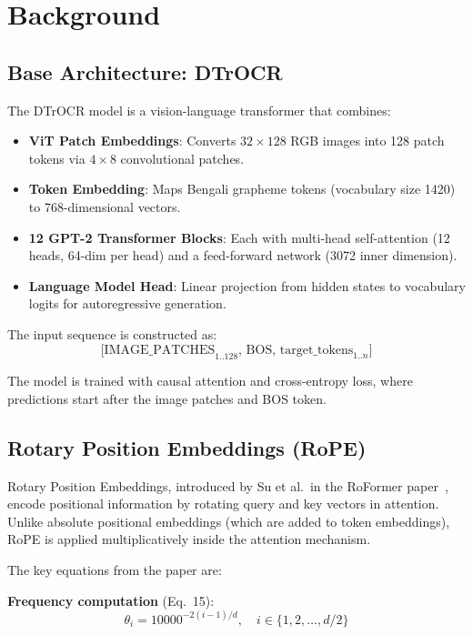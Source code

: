 \documentclass[11pt, a4paper]{article}
\begin{document}
\section{Background}

\subsection{Base Architecture: DTrOCR}

The DTrOCR model is a vision-language transformer that combines:
\begin{itemize}
    \item \textbf{ViT Patch Embeddings}: Converts $32 \times 128$ RGB images into 128 patch tokens via $4 \times 8$ convolutional patches.
    \item \textbf{Token Embedding}: Maps Bengali grapheme tokens (vocabulary size 1420) to 768-dimensional vectors.
    \item \textbf{12 GPT-2 Transformer Blocks}: Each with multi-head self-attention (12 heads, 64-dim per head) and a feed-forward network (3072 inner dimension).
    \item \textbf{Language Model Head}: Linear projection from hidden states to vocabulary logits for autoregressive generation.
\end{itemize}

The input sequence is constructed as:
\[
\text{[IMAGE\_PATCHES}_{1..128}\text{, BOS, target\_tokens}_{1..n}\text{]}
\]

The model is trained with causal attention and cross-entropy loss, where predictions start after the image patches and BOS token.

\subsection{Rotary Position Embeddings (RoPE)}

Rotary Position Embeddings, introduced by Su et al.\ in the RoFormer paper~\cite{su2023roformer}, encode positional information by rotating query and key vectors in attention. Unlike absolute positional embeddings (which are added to token embeddings), RoPE is applied multiplicatively inside the attention mechanism.

The key equations from the paper are:

\textbf{Frequency computation} (Eq.\ 15):
\begin{equation}
\theta_i = 10000^{-2(i-1)/d}, \quad i \in \{1, 2, \ldots, d/2\}
\label{eq:theta}
\end{equation}
\end{document}
